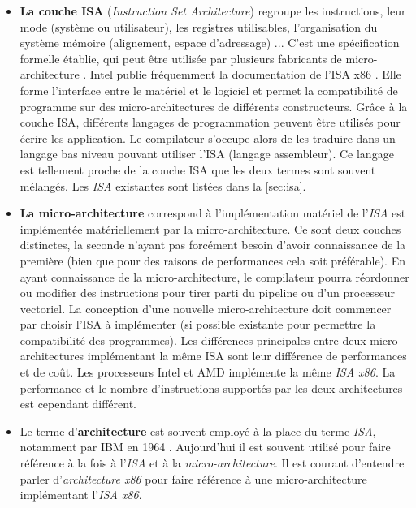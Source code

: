 \begin{itemize}
    \item  \textbf{La couche ISA} (\textit{Instruction Set Architecture}) regroupe les instructions, leur mode (système ou utilisateur), les registres utilisables, l'organisation du système mémoire (alignement, espace d'adressage) ... 
    C'est une spécification formelle établie, qui peut être utilisée par plusieurs fabricants de micro-architecture \cite{tanenbaum2016structured}. Intel publie fréquemment la documentation de l'ISA x86 \cite{guide2011intel}. Elle forme l'interface entre le matériel et le logiciel et permet la compatibilité de programme sur des micro-architectures de différents constructeurs. 
    Grâce à la couche ISA, différents langages de programmation peuvent être utilisés pour écrire les application. Le compilateur s'occupe alors de les traduire dans un langage bas niveau pouvant utiliser l'ISA (langage assembleur). Ce langage est tellement proche de la couche ISA que les deux termes sont souvent mélangés. Les \textit{ISA} existantes sont listées dans la \autoref{sec:isa}. 

    \item \textbf{La micro-architecture} correspond à l'implémentation matériel de l'\textit{ISA} est implémentée matériellement par la micro-architecture. Ce sont deux couches distinctes, la seconde n'ayant pas forcément besoin d'avoir connaissance de la première (bien que pour des raisons de performances cela soit préférable). En ayant connaissance de la micro-architecture, le compilateur pourra réordonner ou modifier des instructions pour tirer parti du pipeline ou d'un processeur vectoriel. La conception d'une nouvelle micro-architecture doit commencer par choisir l'ISA à implémenter (si possible existante pour permettre la compatibilité des programmes). Les différences principales entre deux micro-architectures implémentant la même ISA sont leur différence de performances et de coût. Les processeurs Intel et AMD implémente la même \textit{ISA x86}. La performance et le nombre d'instructions supportés par les deux architectures est cependant différent.
    
    \item Le terme d'\textbf{architecture} est souvent employé à la place du terme \textit{ISA}, notamment par IBM en 1964 \cite{amdahl1964architecture}.  Aujourd'hui il est souvent utilisé pour faire référence à la fois à l'\textit{ISA} et à la \textit{micro-architecture}. Il est courant d'entendre parler d'\textit{architecture x86} pour faire référence à une micro-architecture implémentant l'\textit{ISA x86}.\\ 
\end{itemize}



